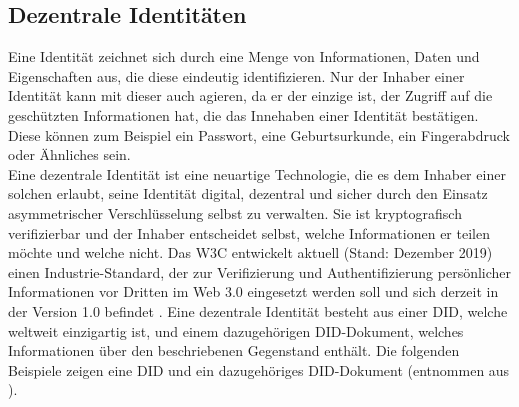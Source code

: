 
\subsection{Dezentrale Identitäten}
\label{subsec:fundamentals:dlt:did}
Eine Identität zeichnet sich durch eine Menge von Informationen, Daten und Eigenschaften aus, die diese eindeutig identifizieren. Nur der Inhaber einer Identität kann mit dieser auch agieren, da er der einzige ist, der Zugriff auf die geschützten Informationen hat, die das Innehaben einer Identität bestätigen. Diese können zum Beispiel ein Passwort, eine Geburtsurkunde, ein Fingerabdruck oder Ähnliches sein.\\
Eine dezentrale Identität ist eine neuartige Technologie, die es dem Inhaber einer solchen erlaubt, seine Identität digital, dezentral und sicher durch den Einsatz asymmetrischer Verschlüsselung selbst zu verwalten. Sie ist kryptografisch verifizierbar und der Inhaber entscheidet selbst, welche Informationen er teilen möchte und welche nicht. Das \ac{W3C} entwickelt aktuell (Stand: Dezember 2019) einen Industrie-Standard, der zur Verifizierung und Authentifizierung persönlicher Informationen vor Dritten im Web 3.0 eingesetzt werden soll und sich derzeit in der Version 1.0 befindet \cite{did2019}. Eine dezentrale Identität besteht aus einer \ac{DID}, welche weltweit einzigartig ist, und einem dazugehörigen DID-Dokument, welches Informationen über den beschriebenen Gegenstand enthält. Die folgenden Beispiele zeigen eine \ac{DID} und ein dazugehöriges DID-Dokument (entnommen aus \cite{did2019}).

